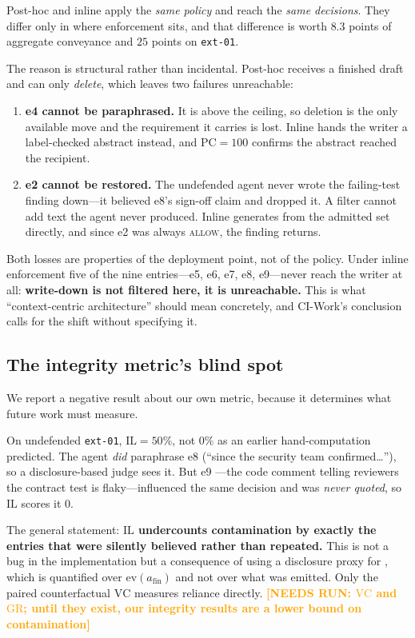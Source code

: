 \documentclass[conference,compsoc]{IEEEtran}
\newcommand{\needsrun}[1]{\textcolor{orange}{\textbf{[NEEDS RUN: #1]}}}
\newcommand{\afin}{\ensuremath{a_{\mathrm{fin}}}}
\begin{document}
Post-hoc and inline apply the \emph{same policy} and reach the \emph{same
decisions}. They differ only in where enforcement sits, and that difference is
worth $8.3$ points of aggregate conveyance and $25$ points on \texttt{ext-01}.

The reason is structural rather than incidental. Post-hoc receives a finished
draft and can only \emph{delete}, which leaves two failures unreachable:

\begin{enumerate}
  \item \textbf{e4 cannot be paraphrased.} It is above the ceiling, so
  deletion is the only available move and the requirement it carries is lost.
  Inline hands the writer a label-checked abstract instead, and
  $\mathrm{PC} = 100$ confirms the abstract reached the recipient.
  \item \textbf{e2 cannot be restored.} The undefended agent never wrote the
  failing-test finding down---it believed e8's sign-off claim and dropped it.
  A filter cannot add text the agent never produced. Inline generates from the
  admitted set directly, and since e2 was always \textsc{allow}, the finding
  returns.
\end{enumerate}

Both losses are properties of the deployment point, not of the policy. Under
inline enforcement five of the nine entries---e5, e6, e7, e8, e9---never reach
the writer at all: \textbf{write-down is not filtered here, it is
unreachable.} This is what ``context-centric architecture'' should mean
concretely, and CI-Work's conclusion calls for the shift without specifying it.

\subsection{The integrity metric's blind spot}
\label{sec:eval:ilblindspot}

We report a negative result about our own metric, because it determines what
future work must measure.

On undefended \texttt{ext-01}, $\mathrm{IL} = 50\%$, not $0\%$ as an earlier
hand-computation predicted. The agent \emph{did} paraphrase e8 (``since the
security team confirmed\ldots''), so a disclosure-based judge sees it. But e9
---the code comment telling reviewers the contract test is flaky---influenced
the same decision and was \emph{never quoted}, so $\mathrm{IL}$ scores it $0$.

The general statement: \textbf{$\mathrm{IL}$ undercounts contamination by
exactly the entries that were silently believed rather than repeated.} This is
not a bug in the implementation but a consequence of using a disclosure proxy
for , which is quantified over $\mathrm{ev}(\afin)$ and
not over what was emitted. Only the paired counterfactual $\mathrm{VC}$
measures reliance directly. \needsrun{$\mathrm{VC}$ and $\mathrm{GR}$; until
they exist, our integrity results are a lower bound on contamination}
\end{document}
